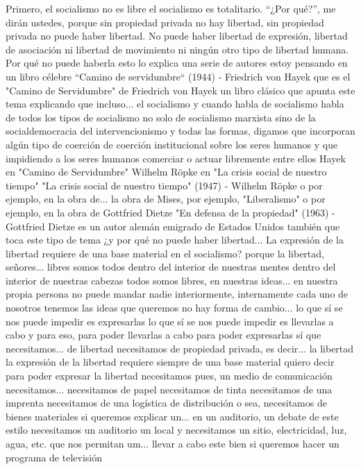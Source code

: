 Primero, el socialismo no es libre el socialismo es totalitario. \enquote{¿Por qué?}, me dirán ustedes, porque sin propiedad privada no hay libertad, sin propiedad privada no puede haber libertad. No puede haber libertad de expresión, libertad de asociación ni libertad de movimiento ni ningún otro tipo de libertad humana. Por qué no puede haberla esto lo explica una serie de autores estoy pensando en un libro célebre ``Camino de servidumbre`` (1944) - Friedrich von Hayek
que es el "Camino de Servidumbre" de Friedrich von Hayek un libro clásico que apunta este tema explicando que incluso...
el socialismo y cuando habla de socialismo habla de todos los tipos de socialismo no solo de socialismo marxista
sino de la socialdemocracia del intervencionismo y todas las formas, digamos que incorporan algún tipo de coerción
de coerción institucional sobre los seres humanos y que impidiendo a los seres humanos comerciar o actuar libremente entre ellos
Hayek en "Camino de Servidumbre" Wilhelm Röpke en "La crisis social de nuestro tiempo"
"La crisis social de nuestro tiempo" (1947) - Wilhelm Röpke
o por ejemplo, en la obra de... la obra de Mises, por ejemplo, "Liberalismo" o por ejemplo, en la obra de Gottfried Dietze
"En defensa de la propiedad" (1963) - Gottfried Dietze
es un autor alemán emigrado de Estados Unidos también que toca este tipo de tema ¿y por qué no puede haber libertad...
La expresión de la libertad requiere de una base material
en el socialismo? porque la libertad, señores... libres somos todos dentro del interior de nuestras mentes
dentro del interior de nuestras cabezas todos somos libres, en nuestras ideas... en nuestra propia persona no puede mandar nadie
interiormente, internamente cada uno de nosotros tenemos las ideas que queremos no hay forma de cambio...
lo que sí se nos puede impedir es expresarlas lo que sí se nos puede impedir
es llevarlas a cabo y para eso, para poder llevarlas a cabo para poder expresarlas sí que necesitamos...
de libertad necesitamos de propiedad privada, es decir... la libertad la expresión de la libertad requiere siempre
de una base material quiero decir para poder expresar la libertad necesitamos pues, un medio de comunicación
necesitamos... necesitamos de papel necesitamos de tinta necesitamos de una imprenta necesitamos de una logística de distribución
o sea, necesitamos de bienes materiales si queremos explicar un... en un auditorio, un debate de este estilo
necesitamos un auditorio un local y necesitamos un sitio, electricidad, luz, agua, etc.
que nos permitan um... llevar a cabo este bien si queremos hacer un programa de televisión
